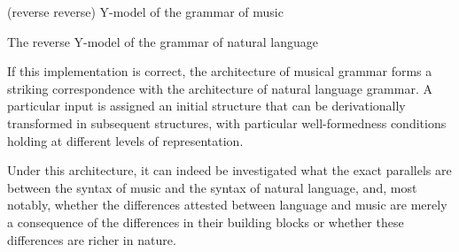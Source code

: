 \documentclass[output=paper]{langsci/langscibook}
\begin{document}
\ea\label{bkm:Ref348624990}
     (reverse reverse) Y-model of the grammar of music\\
    \centering
\z

\ea\label{ex:key:26.6} The reverse Y-model of the grammar of natural language\\
    \centering
\z

If this implementation is correct, the architecture of musical grammar forms a
striking correspondence with the architecture of natural language grammar. A
particular input is assigned an initial structure that can be derivationally
transformed in subsequent structures, with particular well-formedness
conditions holding at different levels of representation.

Under this architecture, it can indeed be investigated what the exact parallels
are between the syntax of music and the syntax of natural language, and, most
notably, whether the differences attested between language and music are merely
a consequence of the differences in their building blocks or whether these
differences are richer in nature.
\end{document}
